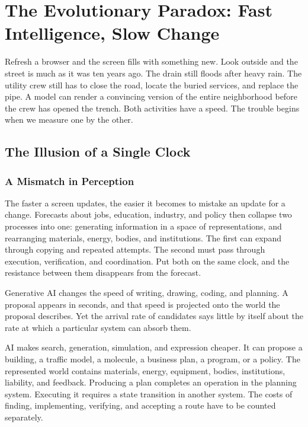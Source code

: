 \chapter{The Evolutionary Paradox: Fast Intelligence, Slow Change}

Refresh a browser and the screen fills with something new. Look outside and the street is much as it was ten years ago. The drain still floods after heavy rain. The utility crew still has to close the road, locate the buried services, and replace the pipe. A model can render a convincing version of the entire neighborhood before the crew has opened the trench. Both activities have a speed. The trouble begins when we measure one by the other.

\section{The Illusion of a Single Clock}

\subsection{A Mismatch in Perception}

The faster a screen updates, the easier it becomes to mistake an update for a change. Forecasts about jobs, education, industry, and policy then collapse two processes into one: generating information in a space of representations, and rearranging materials, energy, bodies, and institutions. The first can expand through copying and repeated attempts. The second must pass through execution, verification, and coordination. Put both on the same clock, and the resistance between them disappears from the forecast.


Generative AI changes the speed of writing, drawing, coding, and planning. A proposal appears in seconds, and that speed is projected onto the world the proposal describes. Yet the arrival rate of candidates says little by itself about the rate at which a particular system can absorb them.

AI makes search, generation, simulation, and expression cheaper. It can propose a building, a traffic model, a molecule, a business plan, a program, or a policy. The represented world contains materials, energy, equipment, bodies, institutions, liability, and feedback. Producing a plan completes an operation in the planning system. Executing it requires a state transition in another system. The costs of finding, implementing, verifying, and accepting a route have to be counted separately.

